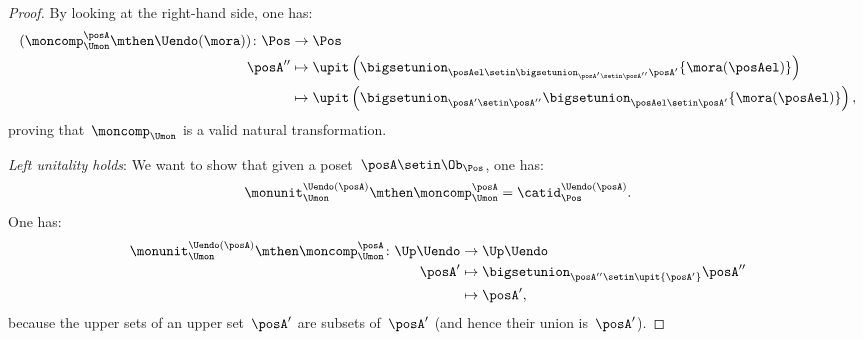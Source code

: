 \begin{proof}
    By looking at the right-hand side, one has:
    \begin{equation}
        \begin{aligned}
            (\moncomp_{\Umon}^\posA \mthen \Uendo(\mora))
            \colon \Pos & \to \Pos \\
            \posA''     & \mapsto \upit \left( \bigsetunion_{\posAel \setin \bigsetunion_{\posA'\setin \posA''}\posA'} \{ \mora(\posAel)\}\right) \\
                        & \mapsto \upit \left( \bigsetunion_{\posA'\setin \posA''}\bigsetunion_{\posAel \setin \posA'}\{\mora(\posAel)\}\right),
        \end{aligned}
    \end{equation}
    proving that~$\moncomp_{\Umon}$ is a valid natural transformation.

    \emph{Left unitality holds}: We want to show that given a poset~$\posA\setin \Ob_\Pos$, one has:
    \begin{equation}
        \monunit_{\Umon}^{\Uendo(\posA)}\mthen \moncomp_{\Umon}^{\posA}=\catid_{\Pos}^{\Uendo(\posA)}.
    \end{equation}
    One has:
    \begin{equation}
        \begin{aligned}
            \monunit_{\Umon}^{\Uendo(\posA)}\mthen \moncomp_{\Umon}^{\posA}\colon \Up \Uendo & \to \Up \Uendo \\
            \posA'                                                                           & \mapsto \bigsetunion_{\posA''\setin \upit \{ \posA'\}} \posA'' \\
                                                                                             & \mapsto \posA',
        \end{aligned}
    \end{equation}
    because the upper sets of an upper set~$\posA'$ are subsets of~$\posA'$ (and hence their union is~$\posA'$).


\end{proof}
